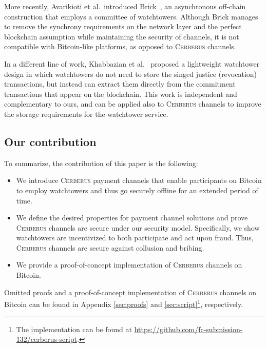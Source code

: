 \documentclass[runningheads]{llncs}
\newcommand{\authnote}[3]{{ \footnotesize \bf{#1[#2: #3]~}}} %
\newcommand{\edit}[1]{\authnote{\color{blue}}{edit}{#1}}
\newcommand{\sys}{\textsc{Cerberus}\xspace}
\begin{document}
More recently, Avarikioti et al.\ introduced Brick~\cite{avarikioti2019brick}, an asynchronous off-chain construction that employs a committee of watchtowers. Although Brick manages to remove the synchrony requirements on the network layer and the perfect blockchain assumption while maintaining the security of channels, it is not compatible with Bitcoin-like platforms, as opposed to \sys channels.

In a different line of work, Khabbazian  et al.~\cite{khabbazian2019outpost} proposed a lightweight watchtower design in which watchtowers do not need to store the singed justice (revocation) transactions, but instead can extract them  directly from the commitment transactions that appear on the blockchain.
This work is independent and complementary to ours, and can be applied also to \sys channels to improve the storage requirements for the watchtower service.

\subsection{Our contribution} To summarize, the contribution of this paper is the following:
\begin{itemize}

    \item We introduce \sys payment channels that 
enable participants on Bitcoin to employ watchtowers and thus go securely offline for an extended period of time.     
    \item We define the desired properties for payment channel solutions and prove \sys channels are secure under our security model. Specifically, we show  watchtowers are incentivized to both participate and act upon fraud. Thus, \sys channels are secure against collusion and bribing.
    \item We provide a proof-of-concept implementation of \sys channels on Bitcoin.
\end{itemize}
Omitted proofs and a proof-of-concept implementation of \sys channels on Bitcoin can be found in Appendix \ref{sec:proofs} and \ref{sec:script}\footnote{The implementation can be found at \url{https://github.com/fc-submission-132/cerberus-script}.}, respectively.
\end{document}
